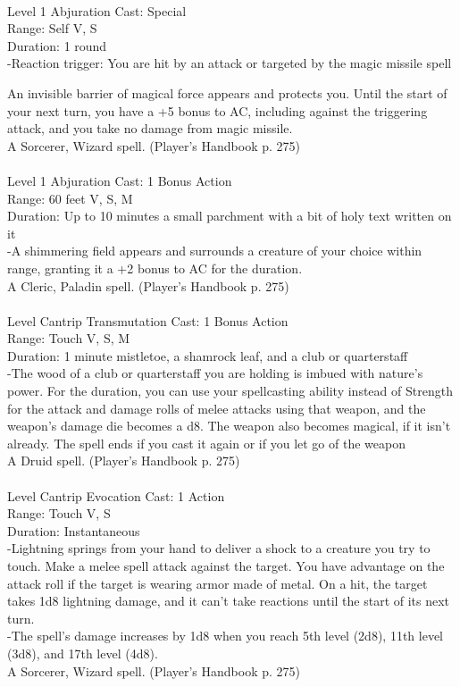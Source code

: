 \documentclass[10pt,twocolumn]{report}
\begin{document}
 \\
Level 1 \quad Abjuration \quad Cast: Special\\
Range: Self \quad V, S\\
Duration: 1 round \quad \\
-Reaction trigger: You are hit by an attack or targeted by the magic missile spell

An invisible barrier of magical force appears and protects you. Until the start of your next turn, you have a +5 bonus to AC, including against the triggering attack, and you take no damage from magic missile.\\
A Sorcerer, Wizard spell. (Player's Handbook p. 275) \\


 \\
Level 1 \quad Abjuration \quad Cast: 1 Bonus Action\\
Range: 60 feet \quad V, S, M\\
Duration: Up to 10 minutes \quad a small parchment with a bit of holy text written on it\\
-A shimmering field appears and surrounds a creature of your choice within range, granting it a +2 bonus to AC for the duration.\\
A Cleric, Paladin spell. (Player's Handbook p. 275) \\


 \\
Level Cantrip \quad Transmutation \quad Cast: 1 Bonus Action\\
Range: Touch \quad V, S, M\\
Duration: 1 minute \quad mistletoe, a shamrock leaf, and a club or quarterstaff\\
-The wood of a club or quarterstaff you are holding is imbued with nature’s power.
For the duration, you can use your spellcasting ability instead of Strength for the attack and damage rolls of melee attacks using that weapon, and the weapon’s damage die becomes a d8. The weapon also becomes magical, if it isn’t already. The spell ends if you cast it again or if you let go of the weapon\\
A Druid spell. (Player's Handbook p. 275) \\


 \\
Level Cantrip \quad Evocation \quad Cast: 1 Action\\
Range: Touch \quad V, S\\
Duration: Instantaneous \quad \\
-Lightning springs from your hand to deliver a shock to a creature you try to touch.
Make a melee spell attack against the target. You have advantage on the attack roll if the target is wearing armor made of metal. On a hit, the target takes 1d8 lightning damage, and it can’t take reactions until the start of its next turn.\\
-The spell’s damage increases by 1d8 when you reach 5th level (2d8), 11th level (3d8), and 17th level (4d8).\\
A Sorcerer, Wizard spell. (Player's Handbook p. 275) \\
\end{document}
